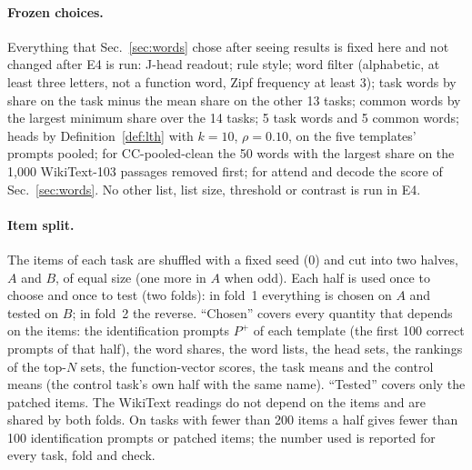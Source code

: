 \documentclass[11pt,a4paper]{article}
\begin{document}
\paragraph{Frozen choices.} Everything that Sec.~\ref{sec:words} chose after seeing results is fixed here
and not changed after E4 is run: J-head readout; rule style; word filter (alphabetic, at least
three letters, not a function word, Zipf frequency at least 3); task words by share on the task
minus the mean share on the other 13 tasks; common words by the largest minimum share over
the 14 tasks; 5 task words and 5 common words; heads by Definition~\ref{def:lth} with $k = 10$,
$\rho = 0.10$, on the five templates' prompts pooled; for CC-pooled-clean the 50 words with the
largest share on the 1{,}000 WikiText-103 passages removed first; for attend and decode the
score of Sec.~\ref{sec:words}. No other list, list size, threshold or contrast is run in E4.

\paragraph{Item split.} The items of each task are shuffled with a fixed seed (0) and cut into
two halves, $A$ and $B$, of equal size (one more in $A$ when odd). Each half is used once to
choose and once to test (two folds): in fold~1 everything is chosen on $A$ and tested on $B$;
in fold~2 the reverse. ``Chosen'' covers every quantity that depends on the items: the
identification prompts $P^+$ of each template (the first 100 correct prompts of that half),
the word shares, the word lists, the head sets, the rankings of the top-$N$ sets, the
function-vector scores, the task means and the control means (the control task's own half
with the same name). ``Tested'' covers only the patched items. The WikiText readings do not
depend on the items and are shared by both folds. On tasks with fewer than 200 items a half
gives fewer than 100 identification prompts or patched items; the number used is reported for
every task, fold and check.
\end{document}
